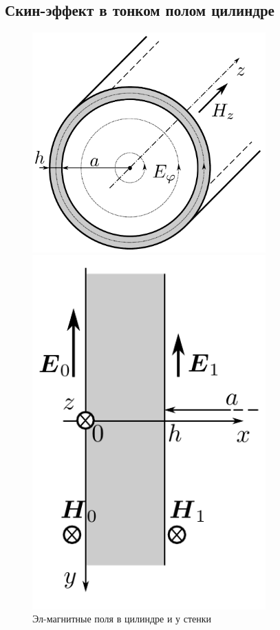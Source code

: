 \documentclass[12pt, a4paper]{article}
\begin{document}
\subsection*{Скин-эффект в тонком полом цилиндре}
\vspace{0cm}
\begin{figure}
  \vspace{-7mm}
  \begin{center}
    \includegraphics[width=0.8\textwidth]{pics/cilindr}
  \end{center}
  \caption{Эл-магнитные поля в цилиндре и у стенки}\label{fig:cilindr}

  \begin{center}
    \includegraphics[width=0.8\textwidth]{pics/stenka}
  \end{center}
  \label{fig:stenka}
\end{figure}
\end{document}
